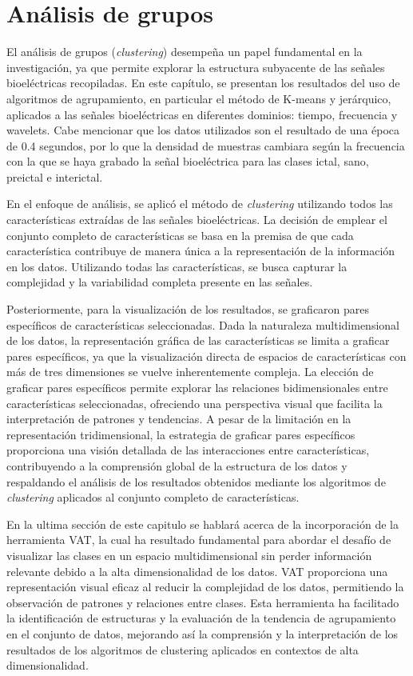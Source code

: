 \chapter{Análisis de grupos}
El análisis de grupos (\textit{clustering}) desempeña un papel fundamental en la investigación, ya que permite explorar la estructura subyacente de las señales bioeléctricas recopiladas. En este capítulo, se presentan los resultados del uso de algoritmos de agrupamiento, en particular el método de K-means y jerárquico, aplicados a las señales bioeléctricas en diferentes dominios: tiempo, frecuencia y wavelets. Cabe mencionar que los datos utilizados son el resultado de una época de 0.4 segundos, por lo que la densidad de muestras cambiara según la frecuencia con la que se haya grabado la señal bioeléctrica para las clases ictal, sano, preictal e interictal.

En el enfoque de análisis, se aplicó el método de \textit{clustering} utilizando todos las características extraídas de las señales bioeléctricas. La decisión de emplear el conjunto completo de características se basa en la premisa de que cada característica contribuye de manera única a la representación de la información en los datos. Utilizando todas las características, se busca capturar la complejidad y la variabilidad completa presente en las señales.

Posteriormente, para la visualización de los resultados, se graficaron pares específicos de características seleccionadas. Dada la naturaleza multidimensional de los datos, la representación gráfica de las características se limita a graficar pares específicos, ya que la visualización directa de espacios de características con más de tres dimensiones se vuelve inherentemente compleja. La elección de graficar pares específicos permite explorar las relaciones bidimensionales entre características seleccionadas, ofreciendo una perspectiva visual que facilita la interpretación de patrones y tendencias. A pesar de la limitación en la representación tridimensional, la estrategia de graficar pares específicos proporciona una visión detallada de las interacciones entre características, contribuyendo a la comprensión global de la estructura de los datos y respaldando el análisis de los resultados obtenidos mediante los algoritmos de \textit{clustering} aplicados al conjunto completo de características.

En la ultima sección de este capitulo se hablará acerca de la incorporación de la herramienta VAT, la cual ha resultado fundamental para abordar el desafío de visualizar las clases en un espacio multidimensional sin perder información relevante debido a la alta dimensionalidad de los datos. VAT proporciona una representación visual eficaz al reducir la complejidad de los datos, permitiendo la observación de patrones y relaciones entre clases. Esta herramienta ha facilitado la identificación de estructuras y la evaluación de la tendencia de agrupamiento en el conjunto de datos, mejorando así la comprensión y la interpretación de los resultados de los algoritmos de clustering aplicados en contextos de alta dimensionalidad.

